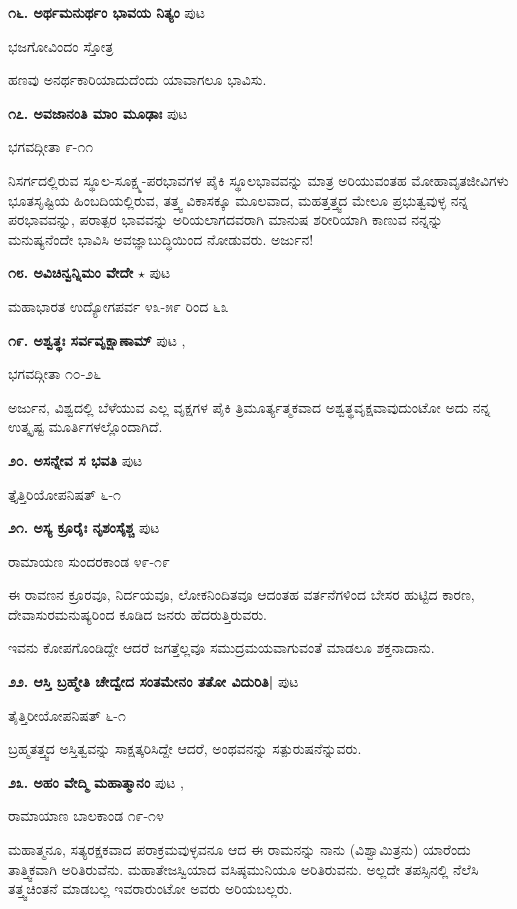 \medskip
\noindent\textbf{೧೬. ಅರ್ಥಮನುರ್ಥಂ ಭಾವಯ ನಿತ್ಯಂ} \hfill ಪುಟ \pageref{55}

\hfill ಭಜಗೋವಿಂದಂ ಸ್ತೋತ್ರ

ಹಣವು ಅನರ್ಥಕಾರಿಯಾದುದೆಂದು ಯಾವಾಗಲೂ ಭಾವಿಸು.

\medskip
\noindent\textbf{೧೭. ಅವಜಾನಂತಿ ಮಾಂ ಮೂಢಾಃ} \hfill ಪುಟ \pageref{139}

\hfill ಭಗವದ್ಗೀತಾ ೯-೧೧

ನಿಸರ್ಗದಲ್ಲಿರುವ ಸ್ಥೂಲ-ಸೂಕ್ಷ್ಮ-ಪರಭಾವಗಳ ಪೈಕಿ ಸ್ಥೂಲಭಾವವನ್ನು ಮಾತ್ರ ಅರಿಯುವಂತಹ ಮೋಹಾವೃತಜೀವಿಗಳು ಭೂತಸೃಷ್ಟಿಯ ಹಿಂಬದಿಯಲ್ಲಿರುವ, ತತ್ತ್ವ ವಿಕಾಸಕ್ಕೂ ಮೂಲವಾದ, ಮಹತ್ತತ್ತ್ವದ ಮೇಲೂ ಪ್ರಭುತ್ವವುಳ್ಳ ನನ್ನ ಪರಭಾವವನ್ನು, ಪರಾತ್ಪರ ಭಾವವನ್ನು ಅರಿಯಲಾಗದವರಾಗಿ ಮಾನುಷ ಶರೀರಿಯಾಗಿ ಕಾಣುವ ನನ್ನನ್ನು  ಮನುಷ್ಯನೆಂದೇ ಭಾವಿಸಿ ಅವಜ್ಞಾಬುದ್ಧಿಯಿಂದ ನೋಡುವರು. ಅರ್ಜುನ!

\medskip
\noindent\textbf{೧೮. ಅವಿಚಿನ್ವನ್ನಿಮಂ ವೇದೇ}  $\star$ \hfill ಪುಟ \pageref{34}

\hfill ಮಹಾಭಾರತ ಉದ್ಯೋಗಪರ್ವ ೪೩-೫೯ ರಿಂದ ೬೩

\medskip
\noindent\textbf{೧೯. ಅಶ್ವತ್ಥಃ ಸರ್ವವೃಕ್ಷಾಣಾಮ್} \hfill ಪುಟ \pageref{53},\pageref{98}

\hfill ಭಗವದ್ಗೀತಾ ೧೦-೨೬

ಅರ್ಜುನ, ವಿಶ್ವದಲ್ಲಿ ಬೆಳೆಯುವ ಎಲ್ಲ ವೃಕ್ಷಗಳ ಪೈಕಿ ತ್ರಿಮೂರ್ತ್ಯತ್ಮಕವಾದ ಅಶ್ವತ್ಥವೃಕ್ಷವಾವುದುಂಟೋ ಅದು ನನ್ನ ಉತ್ಕೃಷ್ಟ ಮೂರ್ತಿಗಳಲ್ಲೊಂದಾಗಿದೆ.

\medskip
\noindent\textbf{೨೦. ಅಸನ್ನೇವ ಸ ಭವತಿ} \hfill ಪುಟ \pageref{24}

\hfill ತ್ತೈತ್ತಿರಿಯೋಪನಿಷತ್ ೬-೧

\medskip
\noindent\textbf{೨೧. ಅಸ್ಯ ಕ್ರೂರೈಃ ನೃಶಂಸೈಶ್ಚ} \hfill ಪುಟ \pageref{192}

\hfill ರಾಮಾಯಣ ಸುಂದರಕಾಂಡ ೪೯-೧೯

ಈ ರಾವಣನ ಕ್ರೂರವೂ, ನಿರ್ದಯವೂ, ಲೋಕನಿಂದಿತವೂ ಆದಂತಹ ವರ್ತನೆಗಳಿಂದ ಬೇಸರ ಹುಟ್ಟಿದ ಕಾರಣ, ದೇವಾಸುರಮನುಷ್ಯರಿಂದ ಕೂಡಿದ ಜನರು ಹೆದರುತ್ತಿರುವರು.

ಇವನು ಕೋಪಗೊಂಡಿದ್ದೇ ಆದರೆ ಜಗತ್ತೆಲ್ಲವೂ ಸಮುದ್ರಮಯವಾಗುವಂತೆ ಮಾಡಲೂ ಶಕ್ತನಾದಾನು.

\medskip
\noindent\textbf{೨೨. ಆಸ್ತಿ ಬ್ರಹ್ಮೇತಿ ಚೇದ್ವೇದ ಸಂತಮೇನಂ ತತೋ ವಿದುರಿತಿ|} \hfill ಪುಟ \pageref{24}

\hfill ತೈತ್ತಿರೀಯೋಪನಿಷತ್ ೬-೧

ಬ್ರಹ್ಮತತ್ತ್ವದ ಅಸ್ತಿತ್ವವನ್ನು ಸಾಕ್ಷತ್ಕರಿಸಿದ್ದೇ ಆದರೆ, ಅಂಥವನನ್ನು ಸತ್ಪುರುಷನೆನ್ನುವರು.

\medskip
\noindent\textbf{೨೩. ಅಹಂ ವೇದ್ಮಿ ಮಹಾತ್ಮಾನಂ} \hfill ಪುಟ \pageref{195},\pageref{251}

\hfill ರಾಮಾಯಾಣ ಬಾಲಕಾಂಡ ೧೯-೧೪

ಮಹಾತ್ಮನೂ, ಸತ್ಯರಕ್ಷಕವಾದ ಪರಾಕ್ರಮವುಳ್ಳವನೂ ಆದ ಈ ರಾಮನನ್ನು ನಾನು (ವಿಶ್ವಾಮಿತ್ರನು) ಯಾರೆಂದು ತಾತ್ತ್ವಿಕವಾಗಿ ಅರಿತಿರುವೆನು. ಮಹಾತೇಜಸ್ವಿಯಾದ ವಸಿಷ್ಠಮುನಿಯೂ ಅರಿತಿರುವನು. ಅಲ್ಲದೇ ತಪಸ್ಸಿನಲ್ಲಿ ನೆಲೆಸಿ ತತ್ತ್ವಚಿಂತನೆ ಮಾಡಬಲ್ಲ ಇವರಾರುಂಟೋ ಅವರು ಅರಿಯಬಲ್ಲರು. 

